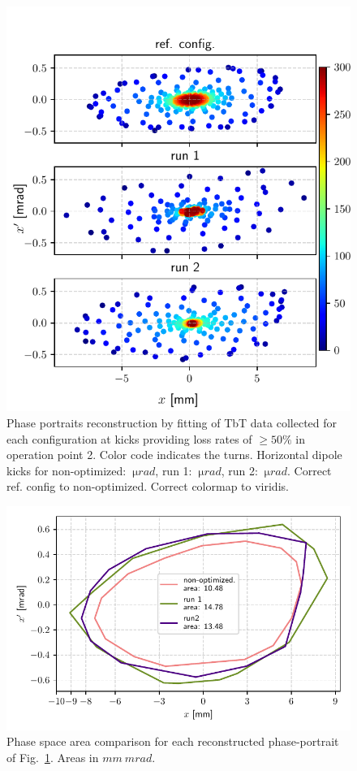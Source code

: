 \documentclass[a4paper,
               keeplastbox,   %
               ]{jacow}
\begin{document}
\begin{figure}
   \includegraphics[width=\columnwidth]{new_tunes_phase.pdf}
   \caption{Phase portraits reconstruction by fitting of TbT data collected for each configuration at kicks providing loss rates of $\geq 50\%$ in operation point 2. Color code indicates the turns. Horizontal dipole kicks for non-optimized: $~\unit{\micro rad}$, run 1: $~\unit{\micro rad}$, run 2: $~\unit{\micro rad}$. Correct ref. config to non-optimized. Correct colormap to viridis.}
   \label{fig:newtunes_phase}
\end{figure}

\begin{figure}
   \includegraphics[width=\columnwidth]{new_tunes_phase_areas.pdf}
   \caption{Phase space area comparison for each reconstructed phase-portrait of Fig.~\ref{fig:newtunes_phase}. Areas in $\unit{mm}~\unit{mrad}$.}
   \label{fig:newtunes_phase_areas}
\end{figure}
\end{document}
